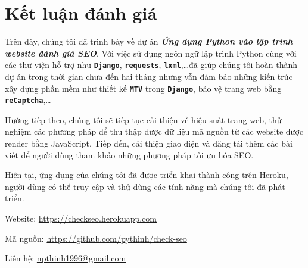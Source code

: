 \chapter{Kết luận đánh giá}
Trên đây, chúng tôi đã trình bày về dự án \textbf{\textit{Ứng dụng Python vào lập trình website đánh giá SEO}}. Với việc sử dụng ngôn ngữ lập trình Python cùng với các thư viện hỗ trợ như \textbf{\texttt{Django}}, \textbf{\texttt{requests}}, \textbf{\texttt{lxml}},\ldots đã giúp chúng tôi hoàn thành dự án trong thời gian chưa đến hai tháng nhưng vẫn đảm bảo những kiến trúc xây dựng phần mềm như thiết kế \textbf{\texttt{MTV}} trong \textbf{\texttt{Django}}, bảo vệ trang web bằng \textbf{\texttt{reCaptcha}},\ldots
\par
Hướng tiếp theo, chúng tôi sẽ tiếp tục cải thiện về hiệu suất trang web, thử nghiệm các phương pháp để thu thập được dữ liệu mã nguồn từ các website được render bằng JavaScript. Tiếp đến, cải thiện giao diện và đăng tải thêm các bài viết để người dùng tham khảo những phương pháp tối ưu hóa SEO.
\par
Hiện tại, ứng dụng của chúng tôi đã được triển khai thành công trên Heroku, người dùng có thể truy cập và thử dùng các tính năng mà chúng tôi đã phát triển.
\par
Website: \url{https://checkseo.herokuapp.com}
\par
Mã nguồn: \url{https://github.com/pythinh/check-seo}
\par
Liên hệ: \href{mailto:npthinh1996@gmail.com}{npthinh1996@gmail.com}